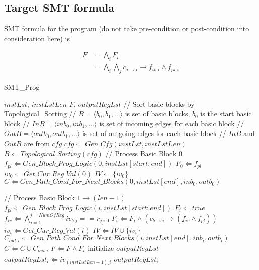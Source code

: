 \documentclass{article}
\begin{document}
\subsection{Target SMT formula}
SMT formula for the program (do not take pre-condition or post-condition into consideration here) is 

\begin{equation}
\begin{aligned}
F &= \bigwedge_i F_{i} \\
  &= \bigwedge_i \bigwedge_j c_{j\rightarrow i}\rightarrow f_{iv\_i} \wedge f_{pl\_i}
\end{aligned}
\end{equation}

\begin{algorithm}
\begin{algorithmic}[1]
\caption{SMT\_Prog}
\label{alg:smt_prog}
\REQUIRE $instLst$, $instLstLen$
\ENSURE $F$, $outputRegLst$
\STATE // Sort basic blocks by Topological\_Sorting
\STATE // $B = \langle b_0, b_1, ...\rangle$ is set of basic blocks, $b_0$ is the start basic block
\STATE // $InB = \langle inb_0, inb_1, ...\rangle$ is set of incoming edges for each basic block
\STATE // $OutB = \langle outb_0, outb_1, ...\rangle$ is set of outgoing edges for each basic block
\STATE // $InB$ and $OutB$ are from $cfg$
\STATE $cfg \Leftarrow Gen\_Cfg(instLst, instLstLen)$
\STATE $B \Leftarrow Topological\_Sorting(cfg)$
\STATE
\STATE // Process Basic Block 0
\STATE $f_{pl} \Leftarrow Gen\_Block\_Prog\_Logic(0,instLst[start:end])$
\STATE $F_0 \Leftarrow f_{pl}$
\STATE $iv_0 \Leftarrow Get\_Cur\_Reg\_Val(0)$
\STATE $IV \Leftarrow \{iv_0\}$
\STATE $C \Leftarrow Gen\_Path\_Cond\_For\_Next\_Blocks(0, instLst[end], inb_0, outb_0)$

\STATE
\STATE // Process Basic Block $1 \rightarrow (len-1)$
\STATE $f_{pl} \Leftarrow Gen\_Block\_Prog\_Logic(i,instLst[start:end])$
\STATE $F_i \Leftarrow true$
\STATE $f_{iv} \Leftarrow \bigwedge_{j=1}^{j=NumOfReg} iv_{b_\_j} ==  r_{j_\_i_\_0}$
\STATE $F_i \Leftarrow F_i \wedge (c_{b \rightarrow i} \rightarrow (f_{iv} \wedge f_{pl}))$
\ENDFOR
\STATE $iv_i \Leftarrow Get\_Cur\_Reg\_Val(i)$
\STATE $IV \Leftarrow IV \cup \{iv_i\}$
\STATE $C_{out\_i} \Leftarrow Gen\_Path\_Cond\_For\_Next\_Blocks(i, instLst[end], inb_i, outb_i)$
\STATE $C \Leftarrow C \cup C_{out_\_i}$
\ENDFOR
\STATE
{}
\STATE $F \Leftarrow F \wedge F_i$
\ENDFOR
\STATE
\STATE initialize $outputRegLst$
\STATE $outputRegLst_i \Leftarrow iv_{(instLstLen-1)\_i}$
\ENDFOR
\RETURN $outputRegLst_i$
\end{algorithmic}
\end{algorithm}
\end{document}
